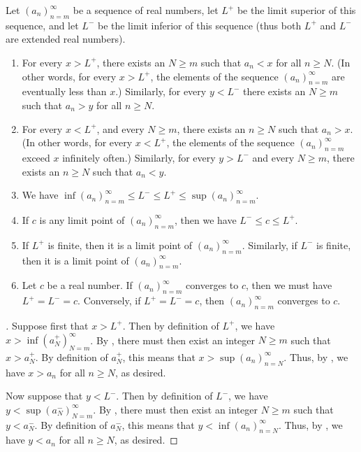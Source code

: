 \begin{prop}\label{i:6.4.12}
  Let \((a_n)_{n = m}^\infty\) be a sequence of real numbers, let \(L^+\) be the limit superior of this sequence, and let \(L^-\) be the limit inferior of this sequence
  (thus both \(L^+\) and \(L^-\) are extended real numbers).
  \begin{enumerate}
    \item\label{i:6.4.12.a} For every \(x > L^+\), there exists an \(N \geq m\) such that \(a_n < x\) for all \(n \geq N\).
    (In other words, for every \(x > L^+\), the elements of the sequence \((a_n)_{n = m}^\infty\) are eventually less than \(x\).)
    Similarly, for every \(y < L^-\) there exists an \(N \geq m\) such that \(a_n > y\) for all \(n \geq N\).
    \item\label{i:6.4.12.b} For every \(x < L^+\), and every \(N \geq m\), there exists an \(n \geq N\) such that \(a_n > x\).
    (In other words, for every \(x < L^+\), the elements of the sequence \((a_n)_{n = m}^\infty\) exceed \(x\) infinitely often.)
    Similarly, for every \(y > L^-\) and every \(N \geq m\), there exists an \(n \geq N\) such that \(a_n < y\).
    \item\label{i:6.4.12.c} We have \(\inf(a_n)_{n = m}^\infty \leq L^- \leq L^+ \leq \sup(a_n)_{n = m}^\infty\).
    \item\label{i:6.4.12.d} If \(c\) is any limit point of \((a_n)_{n = m}^\infty\), then we have \(L^- \leq c \leq L^+\).
    \item\label{i:6.4.12.e} If \(L^+\) is finite, then it is a limit point of \((a_n)_{n = m}^\infty\).
    Similarly, if \(L^-\) is finite, then it is a limit point of \((a_n)_{n = m}^\infty\).
    \item\label{i:6.4.12.f} Let \(c\) be a real number.
    If \((a_n)_{n = m}^\infty\) converges to \(c\), then we must have \(L^+ = L^- = c\).
    Conversely, if \(L^+ = L^- = c\), then \((a_n)_{n = m}^\infty\) converges to \(c\).
  \end{enumerate}
\end{prop}

\begin{proof}[]
  Suppose first that \(x > L^+\).
  Then by definition of \(L^+\), we have \(x > \inf(a_N^+)_{N = m}^\infty\).
  By , there must then exist an integer \(N \geq m\) such that \(x > a_N^+\).
  By definition of \(a_N^+\), this means that \(x > \sup(a_n)_{n = N}^\infty\).
  Thus, by , we have \(x > a_n\) for all \(n \geq N\), as desired.

  Now suppose that \(y < L^-\).
  Then by definition of \(L^-\), we have \(y < \sup(a_N^-)_{N = m}^\infty\).
  By , there must then exist an integer \(N \geq m\) such that \(y < a_N^-\).
  By definition of \(a_N^-\), this means that \(y < \inf(a_n)_{n = N}^\infty\).
  Thus, by , we have \(y < a_n\) for all \(n \geq N\), as desired.
\end{proof}

